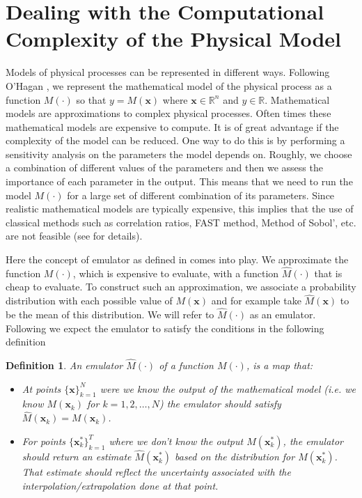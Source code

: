 \documentclass{sfuthesis}
\newtheorem{definition}{Definition}
\newcommand{\x}{\textbf{x}}
\begin{document}
\section{Dealing with  the Computational Complexity of the Physical Model}
Models of physical processes can be represented in different ways.
Following O'Hagan  \cite{o2006bayesian}, we represent the  mathematical model of the physical process
 as a function
$M(\cdot)$ so that $y=M(\x)$ where $\x\in\mathbb{R}^{n}$   and $y\in\mathbb{R}$.
Mathematical models are approximations to complex physical processes. Often times these mathematical
models are expensive to compute. It is of great advantage if the complexity
of the model can be reduced. One way to do
this is by performing a sensitivity analysis on the parameters the model depends on. Roughly, we choose a
combination of different values of the parameters and then we assess the importance of each parameter in
the output. This means that we need to run the model $M(\cdot)$ for a large set 
of different combination of its parameters.
Since realistic mathematical models are typically expensive,
this implies that   the  use of   classical methods such  as correlation
ratios, FAST method, Method of Sobol', etc. 
 are not feasible (see \cite{saltelli2000sensitivity} for details). 

Here the concept of emulator as defined in \cite{o2006bayesian} 
comes into play. We 
approximate the function $M(\cdot)$, which is  expensive to evaluate,
 with a function $\widehat{M}(\cdot)$ that is cheap to evaluate. To construct such an approximation,   
we  associate a 
probability distribution with each  possible value of $M(\textbf{x})$ and for example take 
$\widehat{M}(\x)$ to be  the mean
of this distribution. We will refer to $\widehat{M}(\cdot)$ as an emulator. 
Following \cite{o2006bayesian} we expect the emulator to satisfy the conditions in 
the following definition
\begin{definition}\label{dfnEmulator}
An emulator $\widehat{M}(\cdot)$ of a function $M(\cdot)$, is a map that:
\begin{itemize}
\item At points $\{\x\}_{k=1}^{N}$  were we know the output of the mathematical model (i.e. we know 
$M(\x_{k})$ for $k=1,2,\ldots, N$)
the emulator should satisfy $\widehat{M}(\x_{k})=M(\x_{k})$.
\item For  points $\{\x_{k}^{*}\}_{k=1}^{T}$ where we don't know the output $M(\x_{k}^{*})$, the emulator should
return an estimate $\widehat{M}(\textbf{x}_{k}^{*})$ based on the distribution for $M(\textbf{x}_{k}^{*})$. 
That estimate should reflect the uncertainty associated with
the interpolation/extrapolation done at that point.
\end{itemize} 
\end{definition}
\end{document}
